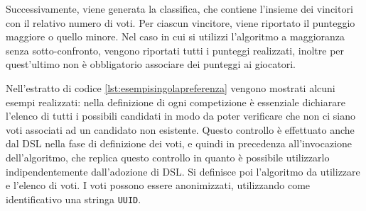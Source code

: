 \documentclass[12pt,a4paper,openright,twoside]{book}
\begin{document}


Successivamente, viene generata la classifica, che contiene l'insieme dei vincitori con il relativo numero di voti. Per ciascun vincitore,
viene riportato il punteggio maggiore o quello minore. Nel caso in cui si utilizzi l'algoritmo a maggioranza senza sotto-confronto, vengono riportati
tutti i punteggi realizzati, inoltre per quest'ultimo non è obbligatorio associare dei punteggi ai giocatori.

Nell'estratto di codice \ref{lst:esempisingolapreferenza} vengono mostrati alcuni esempi realizzati: nella definizione di ogni competizione
è essenziale dichiarare l'elenco di tutti i possibili candidati in modo da poter verificare che non ci siano voti associati ad un candidato non esistente.
Questo controllo è effettuato anche dal DSL nella fase di definizione dei voti, e quindi in precedenza all'invocazione dell'algoritmo,
che replica questo controllo in quanto è possibile utilizzarlo indipendentemente dall'adozione di DSL.
Si definisce poi l'algoritmo da utilizzare e l'elenco di voti. I voti possono essere anonimizzati, utilizzando come identificativo una stringa \texttt{UUID}.



\end{document}
